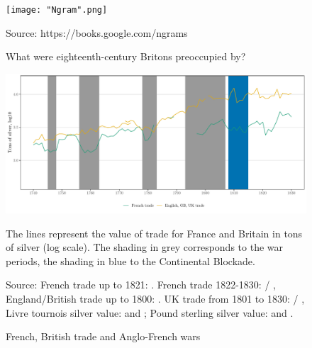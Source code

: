 \documentclass[12pt,a4paper,notitlepage,english]{article}
\newcommand{\fontsmall}{\fontsize{10pt}{12pt}\selectfont}
\newcommand{\source}[1]{\caption*{\footnotesize Source: {#1}} }
\begin{document}
\pagebreak

\renewcommand{\baselinestretch}{1.0}\normalsize




\clearpage


\begin{appendix}


\begin{figure}[h!]
	\caption{What were eighteenth-century Britons preoccupied by?}
	\centering
	\texttt{[image: "Ngram".png]}
	\source{https://books.google.com/ngrams}
	\label{Ngram}
\end{figure}


\begin{figure}[h!]
\caption{French, British trade and Anglo-French wars}\label{FrBritTrade}
\centering
\includegraphics[scale=.2]{Total_silver_trade_FR_GB}
\begin{minipage}{18cm}
\begin{flushleft}
\fontsmall
The lines represent the value of trade for France and Britain in tons of silver (log scale). The shading in grey corresponds to the war periods, the shading in blue to the Continental Blockade.
\source{French trade up to 1821: \cite{Daudin2020}. French trade 1822-1830: \cite{Federico2016} / \cite{Dedinger2017},
England/British trade up to 1800: \cite{Deane1969}. UK trade from 1801 to 1830: \cite{Federico2016} / \cite{Dedinger2017},
Livre tournois silver value: \cite{Dewailly1857} and \cite{Hoffman2000}; Pound sterling silver value: \cite{Clark2006} and \cite{Jastram1981}. }
\end{flushleft}
\end{minipage}
\end{figure}





\end{appendix}
\end{document}
